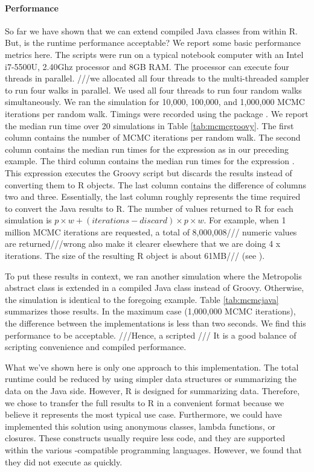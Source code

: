 \paragraph{Performance} So far we have shown that we can extend compiled Java classes from within R. But, is the runtime performance acceptable? We report some basic performance metrics here. The scripts were run on a typical notebook computer with an Intel i7-5500U, 2.40Ghz processor and 8GB RAM. The processor can execute four threads in parallel. ///we allocated all four threads to the multi-threaded sampler to run four walks in parallel. We used all four threads to run four random walks simultaneously. We ran the simulation for 10,000, 100,000, and 1,000,000 MCMC iterations per random walk. Timings were recorded using the  package \citep{microbenchmark}. We report the median run time over 20 simulations in Table \ref{tab:mcmcgroovy}. The first column contains the number of MCMC iterations per random walk. The second column contains the median run times for the expression  as in our preceding example. The third column contains the median run times for the expression . This expression executes the Groovy script but discards the results instead of converting them to R objects. The last column contains the difference of columns two and three. Essentially, the last column roughly represents the time required to convert the Java results to R. The number of values returned to R for each simulation is $p \times w + (iterations - discard) \times p \times w$. For example, when 1 million MCMC iterations are requested, a total of 8,000,008/// numeric values are returned///wrong also make it clearer elsewhere that we are doing 4 x iterations. The size of the resulting R object is about 61MB/// (see ).

To put these results in context, we ran another simulation where the Metropolis abstract class is extended in a compiled Java class instead of Groovy. Otherwise, the simulation is identical to the foregoing example. Table \ref{tab:mcmcjava} summarizes those results. In the maximum case (1,000,000 MCMC iterations), the difference between the implementations is less than two seconds. We find this performance to be acceptable. ///Hence, a scripted /// It is a good balance of scripting convenience and compiled performance.

What we've shown here is only one approach to this implementation. The total runtime could be reduced by using simpler data structures or summarizing the data on the Java side. However, R is designed for summarizing data. Therefore, we chose to transfer the full results to R in a convenient format because we believe it represents the most typical use case. Furthermore, we could have implemented this solution using anonymous classes, lambda functions, or closures. These constructs usually require less code, and they are supported within the various -compatible programming languages. However, we found that they did not execute as quickly.

